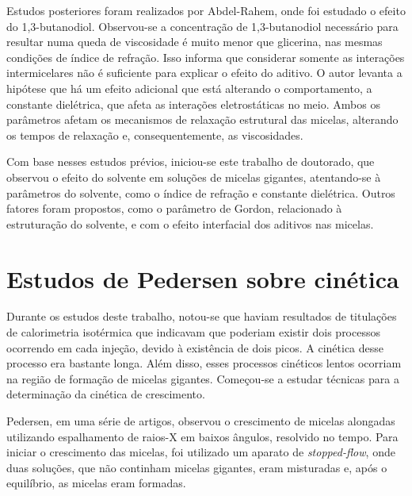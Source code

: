 		Estudos posteriores foram realizados por Abdel-Rahem, onde foi estudado o efeito do 1,3-butanodiol. Observou-se a concentração de 1,3-butanodiol necessário para resultar numa queda de viscosidade é muito menor que glicerina, nas mesmas condições de índice de refração. Isso informa que considerar somente as interações intermicelares não é suficiente para explicar o efeito do aditivo. O autor levanta a hipótese que há um efeito adicional que está alterando o comportamento, a constante dielétrica, que afeta as interações eletrostáticas no meio. Ambos os parâmetros afetam os mecanismos de relaxação estrutural das micelas, alterando os tempos de relaxação e, consequentemente, as viscosidades.
		
		Com base nesses estudos prévios, iniciou-se este trabalho de doutorado, que observou o efeito do solvente em soluções de micelas gigantes, atentando-se à parâmetros do solvente, como o índice de refração e constante dielétrica. Outros fatores foram propostos, como o parâmetro de Gordon, relacionado à estruturação do solvente, e com o efeito interfacial dos aditivos nas micelas.
		
		\section{Estudos de Pedersen sobre cinética}

		
		Durante os estudos deste trabalho, notou-se que haviam resultados de titulações de calorimetria isotérmica que indicavam que poderiam existir dois processos ocorrendo em cada injeção, devido à existência de dois picos. A cinética desse processo era bastante longa. Além disso, esses processos cinéticos lentos ocorriam na região de formação de micelas gigantes. Começou-se a estudar técnicas para a determinação da cinética de crescimento.
		
		Pedersen, em uma série de artigos, observou o crescimento de micelas alongadas utilizando espalhamento de raios-X em baixos ângulos, resolvido no tempo. Para iniciar o crescimento das micelas, foi utilizado um aparato de \emph{stopped-flow}, onde duas soluções, que não continham micelas gigantes, eram misturadas e, após o equilíbrio, as micelas eram formadas.
		
